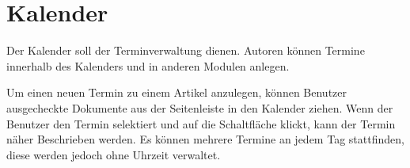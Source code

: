 %

\chapter{Kalender} \label{sec-kalender}

Der Kalender soll der Terminverwaltung dienen. Autoren können Termine
innerhalb des Kalenders und in anderen Modulen anlegen.

Um einen neuen Termin zu einem Artikel anzulegen, können Benutzer
ausgecheckte Dokumente
aus der Seitenleiste in den Kalender ziehen. Wenn der Benutzer den Termin
selektiert und auf die Schaltfläche  klickt, kann der
Termin näher Beschrieben werden. Es können mehrere Termine an jedem Tag
stattfinden, diese werden jedoch ohne Uhrzeit verwaltet.


